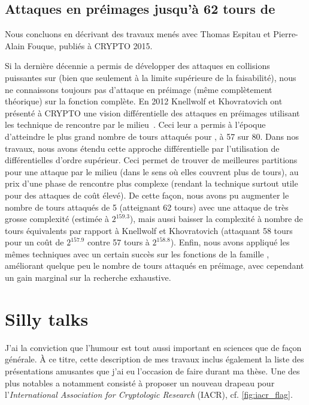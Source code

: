 \subsection{Attaques en préimages jusqu'à 62 tours de \shaone \cite{DBLP:conf/crypto/EspitauFK15}}

Nous concluons en décrivant des travaux menés avec Thomas Espitau et Pierre-Alain Fouque, publiés à CRYPTO 2015.

\medskip

Si la dernière décennie a permis de développer des attaques en collisions puissantes sur \shaone (bien que seulement à la limite supérieure de la faisabilité), nous ne connaissons toujours
pas d'attaque en préimage (même complètement théorique) sur la fonction complète.
En 2012 Knellwolf et Khovratovich ont présenté à CRYPTO une vision différentielle des attaques en préimages utilisant les technique de rencontre par le milieu~\cite{DBLP:conf/crypto/KnellwolfK12}.
Ceci leur a permis à l'époque d'atteindre le plus grand nombre de tours attaqués pour \shaone, à 57 sur 80.
Dans nos travaux, nous avons étendu cette approche différentielle par l'utilisation de différentielles d'ordre supérieur. Ceci permet de trouver de meilleures partitions pour une attaque par
le milieu (dans le sens où elles couvrent plus de tours), au prix d'une phase de rencontre plus complexe (rendant la technique surtout utile pour des attaques de coût élevé). De cette façon,
nous avons pu augmenter le nombre de tours attaqués de 5 (atteignant 62 tours) avec une attaque de très grosse complexité (estimée à $2^{159.3}$), mais aussi baisser la complexité à nombre
de tours équivalents par rapport à Knellwolf et Khovratovich (attaquant 58 tours pour un coût de $2^{157.9}$ contre 57 tours à $2^{158.8}$). Enfin, nous avons appliqué les mêmes
techniques avec un certain succès sur les fonctions de la famille \blake, améliorant quelque peu le nombre de tours attaqués en préimage, avec cependant un gain marginal sur la
recherche exhaustive. 


\section[Divertissements]{Silly talks}

J'ai la conviction que l'humour est tout aussi important en sciences que de façon générale. À ce titre, cette description de mes travaux inclus également la liste des présentations amusantes
que j'ai eu l'occasion de faire durant ma thèse. Une des plus notables a notamment consisté à proposer un nouveau drapeau pour l'\emph{International Association for Cryptologic
Research} (IACR), cf. \autoref{fig:iacr_flag}. 

